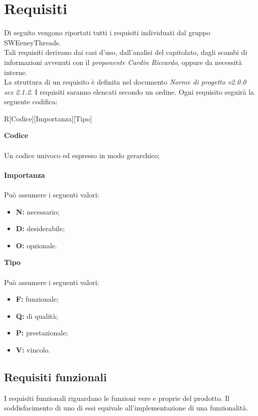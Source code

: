 \documentclass[a4paper]{article}
\begin{document}
	 
	\newpage \section{Requisiti}
		Di seguito vengono riportati tutti i requisiti individuati dal gruppo SWEeneyThreads. \\Tali requisiti
		derivano dai casi d'uso, dall'analisi del capitolato, dagli scambi di informazioni avvenuti con il
		\emph{proponente Cardin Riccardo}, oppure da necessità interne. \\
		La struttura di un requisito è definita nel documento \emph{Norme di progetto v2.0.0 sez 2.1.2}.
		I requisiti saranno elencati secondo un ordine. Ogni requisito seguirà la seguente codifica: \\
		\begin{center}
			R[Codice][Importanza][Tipo]
		\end{center}
		\textbf{Codice} \\ \\ Un codice univoco ed espresso in modo gerarchico;\\ \\
		\textbf{Importanza} \\ \\Può assumere i seguenti valori:
		\begin{itemize}
			\item \textbf{N:} necessario;
			\item \textbf{D:} desiderabile;
			\item \textbf{O:} opzionale.
		\end{itemize}
		\textbf{Tipo} \\ \\Può assumere i seguenti valori:
		\begin{itemize}
			\item \textbf{F:} funzionale;
			\item \textbf{Q:} di qualità;
			\item \textbf{P:} prestazionale;
			\item \textbf{V:} vincolo.
		\end{itemize}
	
	\subsection{Requisiti funzionali}
	I requisiti funzionali riguardano le funzioni vere e proprie del prodotto. Il soddisfacimento di uno di essi
	equivale all'implementazione di una funzionalità.
\end{document}

